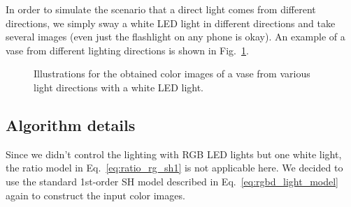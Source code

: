 In order to simulate the scenario that a direct light comes from different directions, we simply sway a white LED light in different directions and take several images (even just the flashlight on any phone is okay). An example of a vase from different lighting directions is shown in Fig.~\ref{fig:robust_setup}.

\begin{figure}[!htbp]
\centering
{}
\caption{Illustrations for the obtained color images of a vase from various light directions with a white LED light.}
\label{fig:robust_setup}
\end{figure}

\subsection{Algorithm details}
Since we didn't control the lighting with RGB LED lights but one white light, the ratio model in Eq.~\ref{eq:ratio_rg_sh1} is not applicable here.
We decided to use the standard 1st-order SH model described in Eq.~\ref{eq:rgbd_light_model} again to construct the input color images.

